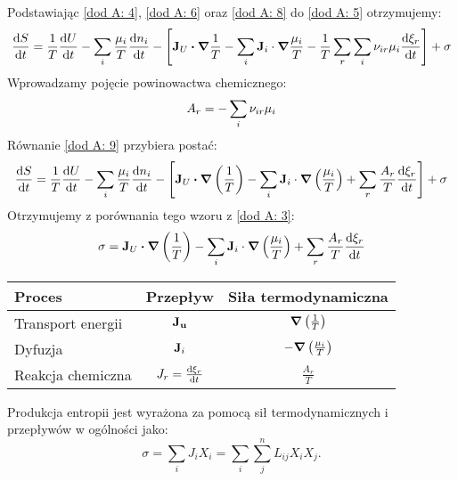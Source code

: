 \documentclass[10pt, a4paper, twoside, onecolumn]{article}
\numberwithin{equation}{section}
\begin{document}
	Podstawiając \eqref{dod A: 4}, \eqref{dod A: 6} oraz \eqref{dod A: 8} do \eqref{dod A: 5} otrzymujemy: 
	\begin{equation} \label{dod A: 9}
		\dv{S}{t}=\frac{1}{T}\dv{U}{t}-\sum_{i}\frac{\mu_{i}}{T}\dv{n_{i}}{t}-\left[\vb{J}_{U}\vdot\grad{\frac{1}{T}}-\sum_{i}\vb{J}_{i}\cdot\grad{\frac{\mu_{i}}{T}}-\frac{1}{T}\sum_{r}\sum_{i}\nu_{ir}\mu_{i}\dv{\xi_{r}}{t}\right]+\sigma
	\end{equation}
	Wprowadzamy pojęcie powinowactwa chemicznego: 
	\begin{equation}
		A_{r}=-\sum_{i}\nu_{ir}\mu_{i} \\
	\end{equation}
	Równanie \eqref{dod A: 9} przybiera postać:
	\begin{equation}
		\dv{S}{t}=\frac{1}{T}\dv{U}{t}-\sum_{i}\frac{\mu_{i}}{T}\dv{n_{i}}{t}-\left[\vb{J}_{U}\vdot\grad{\left(\frac{1}{T}\right)}-\sum_{i}\vb{J}_{i}\cdot\grad{\left(\frac{\mu_{i}}{T}\right)}+\sum_{r}\frac{A_{r}}{T}\dv{\xi_{r}}{t}\right]+\sigma
	\end{equation}
	Otrzymujemy z porównania tego wzoru z \eqref{dod A: 3}:
	\begin{equation}
		\sigma=\vb{J}_{U}\vdot\grad{\left(\frac{1}{T}\right)}-\sum_{i}\vb{J}_{i}\cdot\grad{\left(\frac{\mu_{i}}{T}\right)}+\sum_{r}\frac{A_{r}}{T}\dv{\xi_{r}}{t}
	\end{equation}
	\begin{table}[H]
	\centering
	\begin{tabular}{|l|c|c|}
		\hline
		Proces & Przepływ & Siła termodynamiczna \\
		\hline
		Transport energii & \(\vb{J_{u}}\) & \(\grad{\left(\frac{1}{T}\right)}\) \\
		Dyfuzja & \(\vb{J}_i\) & \(-\grad{\left(\frac{\mu_{i}}{T}\right)}\) \\
		Reakcja chemiczna & \(J_{r}=\dv{\xi_{r}}{t}\) & \(\frac{A_r}{T}\) \\
		\hline
	\end{tabular}
	\end{table}
	Produkcja entropii jest wyrażona za pomocą sił termodynamicznych i przepływów w ogólności jako: 
	\begin{equation}
		\sigma = \sum_{i}J_{i}X_{i} = \sum_{i}\sum_{j}^{n}L_{ij}X_{i}X_{j}.
	\end{equation}
	
\end{document}
